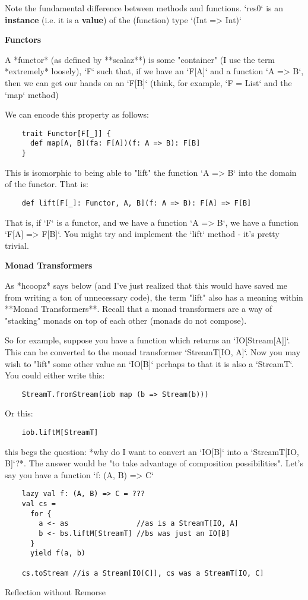 \documentclass{article}
\begin{document}
Note the fundamental difference between methods and functions. `res0` is an \textbf{instance} (i.e. it is a \textbf{value}) of the (function) type `(Int => Int)`

\textbf{Functors}

A *functor* (as defined by **scalaz**) is some "container" (I use the term *extremely* loosely), `F` such that, if we have an `F[A]` and a function `A => B`, then we can get our hands on an `F[B]` (think, for example, `F = List` and the `map` method)

We can encode this property as follows:

\begin{verbatim}
    trait Functor[F[_]] { 
      def map[A, B](fa: F[A])(f: A => B): F[B]
    }
\end{verbatim}

This is isomorphic to being able to "lift" the function `A => B` into the domain of the functor. That is:

\begin{verbatim}
    def lift[F[_]: Functor, A, B](f: A => B): F[A] => F[B]
\end{verbatim}

That is, if `F` is a functor, and we have a function `A => B`, we have a function `F[A] => F[B]`. You might try and implement the `lift` method - it's pretty trivial.

\textbf{Monad Transformers}

As *hcoopz* says below (and I've just realized that this would have saved me from writing a ton of unnecessary code), the term "lift" also has a meaning within **Monad Transformers**. Recall that a monad transformers are a way of "stacking" monads on top of each other (monads do not compose).

So for example, suppose you have a function which returns an `IO[Stream[A]]`. This can be converted to the monad transformer `StreamT[IO, A]`. Now you may wish to "lift" some other value an `IO[B]` perhaps to that it is also a `StreamT`. You could either write this:
\begin{verbatim}
    StreamT.fromStream(iob map (b => Stream(b)))
\end{verbatim}

Or this:
\begin{verbatim}
    iob.liftM[StreamT]
\end{verbatim}    

this begs the question: *why do I want to convert an `IO[B]` into a `StreamT[IO, B]`?*. The answer would be "to take advantage of composition possibilities". Let's say you have a function `f: (A, B) => C`

\begin{verbatim}
    lazy val f: (A, B) => C = ???
    val cs = 
      for {
        a <- as                //as is a StreamT[IO, A]
        b <- bs.liftM[StreamT] //bs was just an IO[B]
      }
      yield f(a, b)

    cs.toStream //is a Stream[IO[C]], cs was a StreamT[IO, C]
\end{verbatim}



Reflection without Remorse
\end{document}

